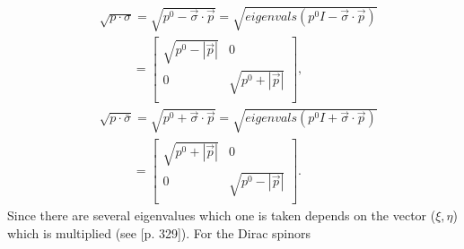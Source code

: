 \begin{equation}
	\begin{split}
		&\sqrt{p\cdot \sigma}=\sqrt{p^0-\vec{\sigma}\cdot\vec{p}}=\sqrt{eigenvals(p^0I-\vec{\sigma}\cdot\vec{p})}\\
		&\qquad \,\,\,\, =\begin{bmatrix}
			\sqrt{p^0-|\vec{p}|} & 0 \\
			0 & \sqrt{p^0+|\vec{p}|}\\
		\end{bmatrix},\\
		&\sqrt{p\cdot \bar{\sigma}}=\sqrt{p^0+\vec{\sigma}\cdot\vec{p}}=\sqrt{eigenvals(p^0I+\vec{\sigma}\cdot\vec{p})}\\
		&\qquad \,\,\,\, =\begin{bmatrix}
			\sqrt{p^0+|\vec{p}|} & 0 \\
			0 & \sqrt{p^0-|\vec{p}|}\\
		\end{bmatrix}.
	\end{split}
\end{equation} 
Since there are several eigenvalues which one is taken depends on the vector ($\xi,\eta$) which is multiplied (see \citealt{Lancaster2014}[p. 329]). For the Dirac spinors
